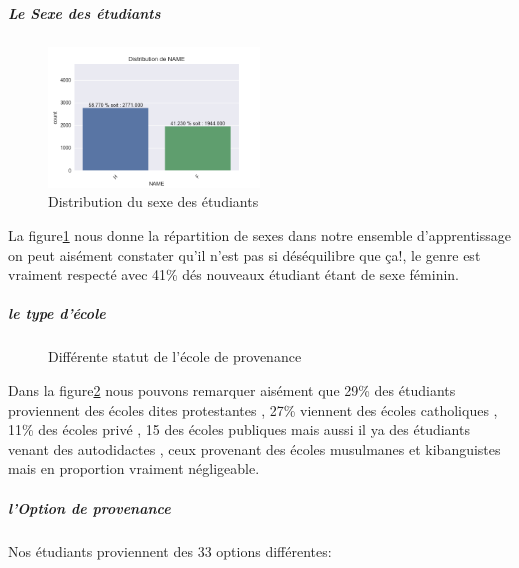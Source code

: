 \subparagraph{Le Sexe des étudiants}
	\begin{figure}[!htbp]
	\centering
	\includegraphics[width=0.5\textwidth]{fig/NAME.png}
	\caption{Distribution du sexe des étudiants }
	\label{fig:SEXE}
\end{figure}
La  figure\ref{fig:SEXE} nous donne la  répartition de sexes dans notre ensemble d'apprentissage on peut aisément constater qu'il n'est pas si déséquilibre que ça!, le
genre est vraiment respecté avec 41\% dés nouveaux étudiant étant de
sexe féminin.
\subparagraph{le type d'école}
\begin{figure}[!htbp]
	\centering
	\caption{Différente statut de l'école de provenance }
	\label{fig:SchoolStatus}
\end{figure}
 Dans la figure\ref{fig:SchoolStatus} nous pouvons remarquer aisément que 29\% des étudiants
proviennent des écoles dites protestantes , 27\% viennent des écoles
catholiques , 11\% des écoles privé , 15 des écoles publiques mais aussi
il ya des étudiants venant des autodidactes , ceux provenant des écoles
musulmanes et kibanguistes mais en proportion vraiment négligeable.
\subparagraph{l'Option de provenance}
Nos étudiants proviennent des 33 options différentes:

